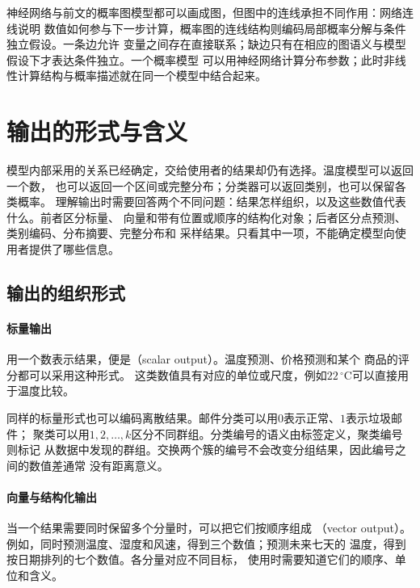 神经网络与前文的概率图模型都可以画成图，但图中的连线承担不同作用：网络连线说明
数值如何参与下一步计算，概率图的连线结构则编码局部概率分解与条件独立假设。一条边允许
变量之间存在直接联系；缺边只有在相应的图语义与模型假设下才表达条件独立。一个概率模型
可以用神经网络计算分布参数；此时非线性计算结构与概率描述就在同一个模型中结合起来。

\FloatBarrier
\section{输出的形式与含义}
\label{sec:models-output}

模型内部采用的关系已经确定，交给使用者的结果却仍有选择。温度模型可以返回一个数，
也可以返回一个区间或完整分布；分类器可以返回类别，也可以保留各类概率。
理解输出时需要回答两个不同问题：结果怎样组织，以及这些数值代表什么。前者区分标量、
向量和带有位置或顺序的结构化对象；后者区分点预测、类别编码、分布摘要、完整分布和
采样结果。只看其中一项，不能确定模型向使用者提供了哪些信息。

\subsection{输出的组织形式}
\label{sec:models-output-form}

\paragraph{标量输出}
\label{sec:models-scalar-output}

用一个数表示结果，便是（scalar output）。温度预测、价格预测和某个
商品的评分都可以采用这种形式。
这类数值具有对应的单位或尺度，例如$22\,^{\circ}\mathrm{C}$可以直接用于温度比较。

同样的标量形式也可以编码离散结果。邮件分类可以用$0$表示正常、$1$表示垃圾邮件；
聚类可以用$1,2,\ldots,k$区分不同群组。分类编号的语义由标签定义，聚类编号则标记
从数据中发现的群组。交换两个簇的编号不会改变分组结果，因此编号之间的数值差通常
没有距离意义。

\paragraph{向量与结构化输出}
\label{sec:models-vector-output}

当一个结果需要同时保留多个分量时，可以把它们按顺序组成
（vector output）。例如，同时预测温度、湿度和风速，得到三个数值；预测未来七天的
温度，得到按日期排列的七个数值。各分量对应不同目标，
使用时需要知道它们的顺序、单位和含义。

